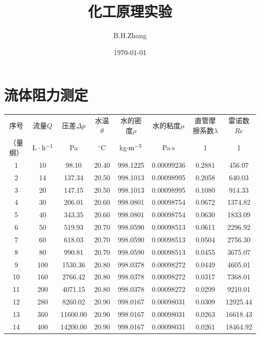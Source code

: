\documentclass[UTF8,AutoFakeBold,a4paper]{article}
\title{\textbf{化工原理实验}}
\date{\today}
\author{B.H.Zhang}
\begin{document}
\maketitle
\section{流体阻力测定}


\begin{table}[h]
		\centering
		\begin{tabular}{cccccccc}
		\toprule
		
 序号 & 流量$Q$ & 压差$\Delta p$ & 水温$\theta$ & 水的密度$\rho$ & 水的粘度$\mu$ & 直管摩擦系数$\lambda$ & 雷诺数$Re$ \\ 
  （量纲）&$\rm{L}\cdot\rm{h}^{-1}$&Pa&$^{\circ}$C&kg$\cdot\rm{m}^{-3}$&Pa$\cdot$s&1&1\\
 \midrule
		1 & 10 & 98.10 & 20.40 & 998.1225 & 0.00099236 & 0.2881 & 456.07 \\ 
        2 & 14 & 137.34 & 20.50 & 998.1013 & 0.00098995 & 0.2058 & 640.03 \\ 
        3 & 20 & 147.15 & 20.50 & 998.1013 & 0.00098995 & 0.1080 & 914.33 \\ 
        4 & 30 & 206.01 & 20.60 & 998.0801 & 0.00098754 & 0.0672 & 1374.82 \\ 
        5 & 40 & 343.35 & 20.60 & 998.0801 & 0.00098754 & 0.0630 & 1833.09 \\ 
        \rowcolor{mypink}
        6 & 50 & 519.93 & 20.70 & 998.0590 & 0.00098513 & 0.0611 & 2296.92 \\ 
        \rowcolor{mypink}
        7 & 60 & 618.03 & 20.70 & 998.0590 & 0.00098513 & 0.0504 & 2756.30 \\ 
        \rowcolor{mypink}
        8 & 80 & 990.81 & 20.70 & 998.0590 & 0.00098513 & 0.0455 & 3675.07 \\ 
        9 & 100 & 1530.36 & 20.80 & 998.0378 & 0.00098272 & 0.0449 & 4605.01 \\ 
        10 & 160 & 2766.42 & 20.80 & 998.0378 & 0.00098272 & 0.0317 & 7368.01 \\ 
        11 & 200 & 4071.15 & 20.80 & 998.0378 & 0.00098272 & 0.0299 & 9210.01 \\ 
        12 & 280 & 8260.02 & 20.90 & 998.0167 & 0.00098031 & 0.0309 & 12925.44 \\ 
        13 & 360 & 11600.00 & 20.90 & 998.0167 & 0.00098031 & 0.0263 & 16618.43 \\ 
        14 & 400 & 14200.00 & 20.90 & 998.0167 & 0.00098031 & 0.0261 & 18464.92 \\ 

\end{tabular}
\end{table}
\end{document}
